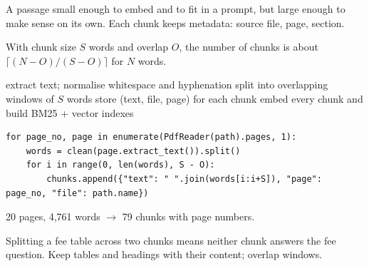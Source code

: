\documentclass[11pt,a4paper]{article}
\begin{document}

\begin{bdef}[Chunk]
A passage small enough to embed and to fit in a prompt, but large enough to make sense on its own. Each chunk keeps metadata: source file, page, section.
\end{bdef}
\begin{bmath}
With chunk size $S$ words and overlap $O$, the number of chunks is about $\lceil (N-O)/(S-O)\rceil$ for $N$ words.
\end{bmath}
\begin{balgo}[Ingestion]
\begin{algorithmic}[1]
  \State extract text; normalise whitespace and hyphenation
  \State split into overlapping windows of $S$ words
  \State store (text, file, page) for each chunk
\EndFor
\State embed every chunk and build BM25 + vector indexes
\end{algorithmic}
\end{balgo}
\begin{bcode}
\begin{lstlisting}
for page_no, page in enumerate(PdfReader(path).pages, 1):
    words = clean(page.extract_text()).split()
    for i in range(0, len(words), S - O):
        chunks.append({"text": " ".join(words[i:i+S]), "page": page_no, "file": path.name})
\end{lstlisting}
\end{bcode}
\begin{bres}
20 pages, 4,761 words $\rightarrow$ 79 chunks with page numbers.
\end{bres}
\begin{bwarn}
Splitting a fee table across two chunks means neither chunk answers the fee question. Keep tables and headings with their content; overlap windows.
\end{bwarn}

\end{document}

